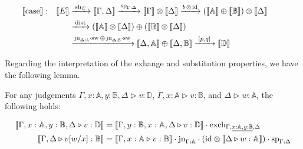 \begin{align*}
    &\hspace{-20pt}\llbracket \text{case} \rrbracket : & [\![E]\!] & \xrightarrow{\hspace{2pt}\text{sh}_{E}\hspace{2pt}}   [\![\Gamma,\Delta ]\!]   \xrightarrow{\hspace{1pt}\text{sp}_{\Gamma;\Delta}\hspace{1pt}}  [\![\Gamma ]\!] \otimes [\![\Delta ]\!] \xrightarrow{ b \hspace{1pt} \otimes \hspace{1pt} \id} ([\![\mathbb{A} ]\!] \oplus[\![\mathbb{B} ]\!]) \otimes [\![\Delta ]\!]   \\
     & &  &\xrightarrow{\hspace{2pt}\dist\hspace{1pt}} \left([\![\mathbb{A} ]\!] \otimes [\![\Delta ]\!]\right) \oplus \left([\![\mathbb{B} ]\!] \otimes [\![\Delta ]\!]\right)  \\
     & & &  \xrightarrow{\hspace{1pt}\text{jn}_{\Delta;\typeA}\comp \sw \,\oplus  \, \text{jn}_{\Delta;\typeB}\comp \sw\hspace{1pt}} [\![ \Delta,\mathbb{A}]\!]\oplus [\![\Delta, \mathbb{B} ]\!]\xrightarrow{\hspace{2pt}[p,q]\hspace{2pt}} \llbracket \mathbb{D} \rrbracket \\
\end{align*} 


Regarding the interpretation of the exhange and substitution properties, we have the following lemma.

\begin{lemma} \label{lem:sub_exch} 
  For any judgements $\Gamma, x: \mathbb{A}, y: \mathbb{B}, \Delta \triangleright v : \mathbb{D}$, $\Gamma, x: \mathbb{A} \triangleright v: \mathbb{B}$, and $\Delta \triangleright w: \mathbb{A}$, the following holds:
\end{lemma}
\vspace{-30pt}
\begin{equation*}
\begin{split}
  \llbracket \Gamma, x: \mathbb{A}, y: \mathbb{B}, \Delta \triangleright v : \mathbb{D} \rrbracket & = \llbracket \Gamma,  y: \mathbb{B}, x: \mathbb{A}, \Delta \triangleright v : \mathbb{D} \rrbracket \cdot \text{exch}_{\Gamma, \underline{x: \mathbb{A}, y: \mathbb{B}}, \Delta}\\
  \llbracket \Gamma,\Delta \triangleright v[w/x]: \mathbb{B} \rrbracket & = \llbracket \Gamma, x: \mathbb{A} \triangleright v: \mathbb{B} \rrbracket \cdot \text{jn}_{\Gamma;\mathbb{A}} \cdot (\mathrm{id} \otimes \llbracket \Delta \triangleright w: \mathbb{A} \rrbracket ) \cdot \text{sp}_{\Gamma; \Delta} 
\end{split}
\end{equation*}


